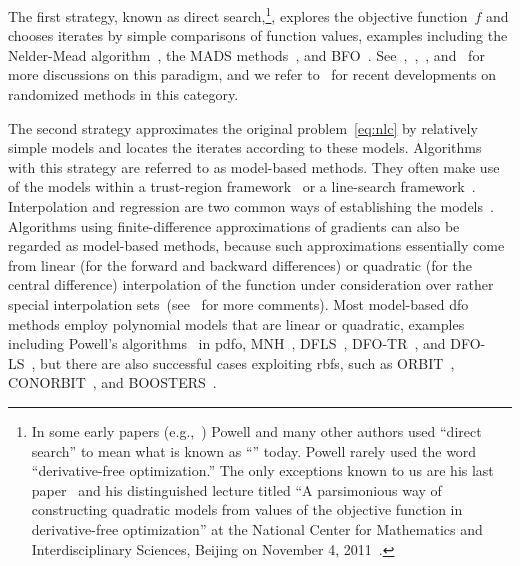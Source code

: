 \documentclass[
    smallextended,  %
    final,          %
]{svjour3}
\newcommand{\obj}{f}
\begin{document}
The first strategy, known as direct search,\footnote{In some early papers (e.g.,~\cite{Powell_1994,Powell_1998})
Powell and many other authors used ``direct search'' to mean what is known as ``'' today. Powell rarely used the word ``derivative-free optimization.''
The only exceptions known to us are his last paper~\cite{Powell_2015} and his distinguished lecture
titled ``A parsimonious way of constructing quadratic models from values of the objective function in
derivative-free optimization'' at the National Center for Mathematics and Interdisciplinary Sciences,
Beijing on November 4, 2011~\cite{Buhmann_Fletcher_Iserles_Toint_2018}.}, explores the objective
function~$\obj$ and chooses iterates by simple comparisons of function values, examples including
the Nelder-Mead algorithm~\cite{Nelder_Mead_1965}, the MADS methods~\cite{Audet_Dennis_2006,Digabel_2011}, and BFO~\cite{Porcelli_Toint_2017,Porcelli_Toint_2020,Porcelli_Toint_2022}.
See~\cite{Kolda_Lewis_Torczon_2003},~\cite[Chapters~7 and~8]{Conn_Scheinberg_Vicente_2009b},~\cite[Part~3]{Audet_Hare_2017}, and~\cite[\S~2.1]{Larson_Menickelly_Wild_2019} for more discussions on this paradigm, and we refer to~\cite{Gratton_Etal_2015,Gratton_Etal_2019} for recent developments on randomized methods in this category.

The second strategy approximates the original problem~\eqref{eq:nlc} by relatively simple models and locates the iterates according to these models.
Algorithms with this strategy are referred to as model-based methods. They often make use of the models within a trust-region framework~\cite{Conn_Scheinberg_Vicente_2009a} or a line-search framework~\cite{Berahas_Byrd_Nocedal_2019}.
Interpolation and regression are two common ways of establishing the models~\cite{Powell_2001,Conn_Scheinberg_Vicente_2008a,Conn_Scheinberg_Vicente_2008b,Wild_Regis_Shoemaker_2008,Bandeira_Scheinberg_Vicente_2012,Billups_Larson_Graf_2013,Regis_Wild_2017}.
Algorithms using finite-difference approximations of gradients can also be regarded as model-based
methods, because such approximations essentially come from linear (for the forward and backward
differences) or quadratic (for the central difference) interpolation of the function under
consideration over rather special interpolation sets~(see~\cite[\S~1.4.3]{Ragonneau_2022} for more comments).
Most model-based \gls{dfo} methods employ polynomial models that are linear or quadratic, examples including
Powell's algorithms~\cite{Powell_1994,Powell_2002,Powell_2006,Powell_2009} in \gls{pdfo},
MNH~\cite{Wild_2008}, DFLS~\cite{Zhang_Conn_Scheinberg_2010},
DFO-TR~\cite{Bandeira_Scheinberg_Vicente_2012}, and DFO-LS~\cite{Cartis_Etal_2019,Hough_Roberts_2022}, but there are also successful cases exploiting \glspl{rbf}, such as ORBIT~\cite{Wild_Regis_Shoemaker_2008}, CONORBIT~\cite{Regis_Wild_2017}, and BOOSTERS~\cite{Oeuvray_Bierlaire_2009}.
\end{document}
